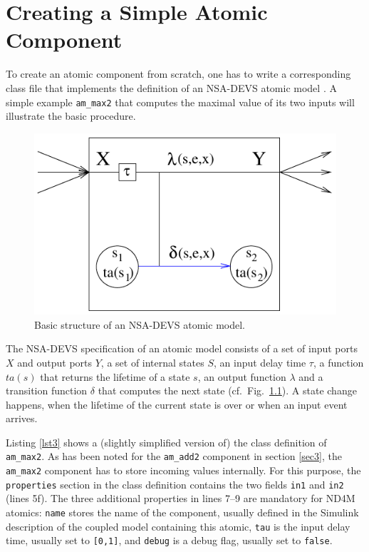 \documentclass[12pt,oneside,a4paper,bibtotoc,BCOR=0pt,DIV=20]{scrreprt}
\newcommand{\cft}[1]{\mbox{\texttt{#1}}}   %
\begin{document}
\chapter{Creating a Simple Atomic Component} \label{sec7}

To create an atomic component from scratch, one has to write a corresponding
class file that implements the definition of an NSA-DEVS atomic model
\cite{nsaSimulator2}. A simple example \cft{am\_max2} that computes the maximal
value of its two inputs will illustrate the basic procedure.

\begin{figure}[ht]
\centering
\includegraphics[width=0.40\columnwidth]{images/bild11.pdf}
\caption{Basic structure of an NSA-DEVS atomic model.}
\label{fig_11}
\end{figure}

The NSA-DEVS specification of an atomic model consists of a set of input ports
$X$ and output ports $Y$, a set of internal states $S$, an input delay time
$\tau$, a function $ta(s)$ that returns the lifetime of a state $s$, an output
function $\lambda$ and a transition function $\delta$ that computes the next
state (cf.\ Fig.\ \ref{fig_11}). A state change happens, when the lifetime of
the current state is over or when an input event arrives.

Listing \ref{lst3} shows a (slightly simplified version of) the class
definition of \cft{am\_max2}. As has been noted for the \cft{am\_add2}
component in section \ref{sec3}, the \cft{am\_max2} component has to store
incoming values internally. For this purpose, the \cft{properties} section in
the class definition contains the two fields \cft{in1} and \cft{in2} (lines
5f). The three additional properties in lines 7--9 are mandatory for ND4M
atomics: \cft{name} stores the name of the component, usually defined in the
Simulink description of the coupled model containing this atomic, \cft{tau} is
the input delay time, usually set to \cft{[0,1]}, and \cft{debug} is a debug
flag, usually set to \cft{false}.
\end{document}
